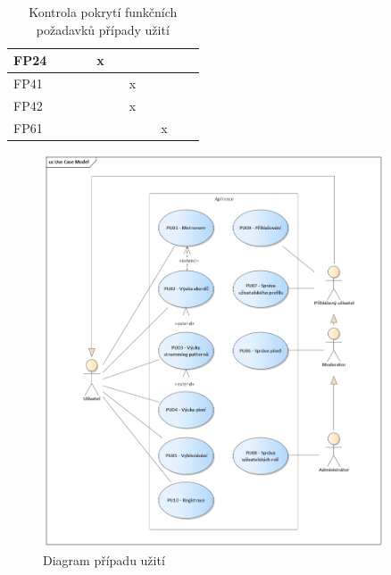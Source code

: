 \begin{table}
\begin{tabular}{l|l|l|l|l|l|l|l|l|l|l}
          \hline
          FP24 &                                &                                &                                & x                              &                                &                                &                                &                                &                                &                                \\
          \hline
          FP41 &                                &                                &                                &                                &                                & x                              &                                &                                &                                &                                \\
          \hline
          FP42 &                                &                                &                                &                                &                                & x                              &                                &                                &                                &                                \\
          \hline
          FP61 &                                &                                &                                &                                &                                &                                &                                & x                              &                                &
     \end{tabular}
     \caption{Kontrola pokrytí funkčních požadavků případy užití}
     \label{tab:func_req_uc_table}
\end{table}


\begin{figure}
     \centering
     \includegraphics[width=0.9\textwidth]{assets/use_case_model.png}
     \caption{Diagram případu užití}
     \label{fig:use_case}
\end{figure}